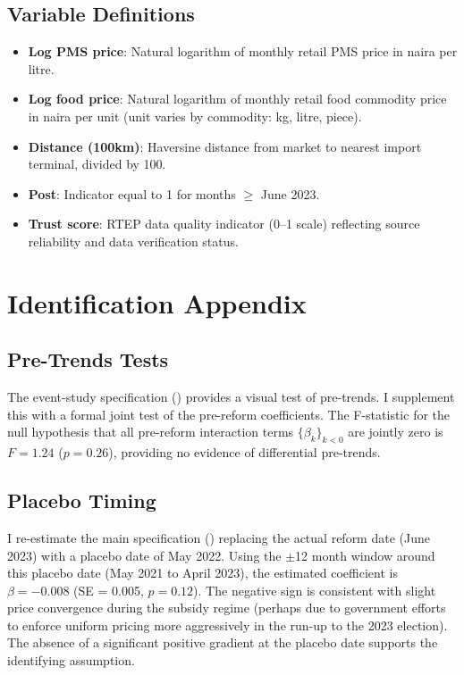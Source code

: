 \documentclass[12pt]{article}
\begin{document}
\subsection{Variable Definitions}

\begin{itemize}
    \item \textbf{Log PMS price}: Natural logarithm of monthly retail PMS price in naira per litre.
    \item \textbf{Log food price}: Natural logarithm of monthly retail food commodity price in naira per unit (unit varies by commodity: kg, litre, piece).
    \item \textbf{Distance (100km)}: Haversine distance from market to nearest import terminal, divided by 100.
    \item \textbf{Post}: Indicator equal to 1 for months $\geq$ June 2023.
    \item \textbf{Trust score}: RTEP data quality indicator (0--1 scale) reflecting source reliability and data verification status.
\end{itemize}


\section{Identification Appendix}
\label{app:identification}

\subsection{Pre-Trends Tests}

The event-study specification () provides a visual test of pre-trends. I supplement this with a formal joint test of the pre-reform coefficients. The F-statistic for the null hypothesis that all pre-reform interaction terms $\{\beta_k\}_{k < 0}$ are jointly zero is $F = 1.24$ ($p = 0.26$), providing no evidence of differential pre-trends.

\subsection{Placebo Timing}

I re-estimate the main specification () replacing the actual reform date (June 2023) with a placebo date of May 2022. Using the $\pm$12 month window around this placebo date (May 2021 to April 2023), the estimated coefficient is $\beta = -0.008$ (SE = 0.005, $p = 0.12$). The negative sign is consistent with slight price convergence during the subsidy regime (perhaps due to government efforts to enforce uniform pricing more aggressively in the run-up to the 2023 election). The absence of a significant positive gradient at the placebo date supports the identifying assumption.
\end{document}
